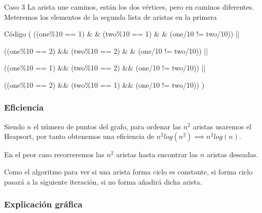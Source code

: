 \begin{frame}
	\begin{block}{Caso 3}
	La arista une caminos, están los dos vértices, pero en caminos diferentes.
	Meteremos los elementos de la segunda lista de aristas en la primera
	\end{block}
	
	\begin{exampleblock}{Código}            
	\hspace{1cm}( ((one\%10 == 1) \& \& (two\%10 == 1) \& \& (one/10 != two/10)) ||
	               
	\hspace{1cm}((one\%10 == 2) \&\& (two\%10 == 2) \& \& (one/10 != two/10)) ||

	\hspace{1cm}((one\%10 == 1) \&\& (two\%10 == 2) \&\& (one/10 != two/10)) ||

	\hspace{1cm}((one\%10 == 2) \&\& (two\%10 == 1) \&\& (one/10 != two/10)) )
	\end{exampleblock}
\end{frame}
           

\subsubsection{Eficiencia}
\begin{frame}
	\begin{block}{ }
	Siendo $n$ el número de puntos del grafo, para ordenar las $n^2$ aristas usaremos el 	
	Heapsort, por tanto obtenemos una eficiencia de $n^2log(n^2) \implies n^2log(n)$.
	\end{block}
	
	\begin{block}{ }
	En el peor caso recorreremos las $n^2$ aristas hasta encontrar las $n$ aristas  	
	deseadas.

	Como el algoritmo para ver si una arista forma ciclo es constante, si forma ciclo 
	pasará a la siguiente iteración, si no forma añadirá dicha arista.
	\end{block}
\end{frame}

\subsubsection{Explicación gráfica}


